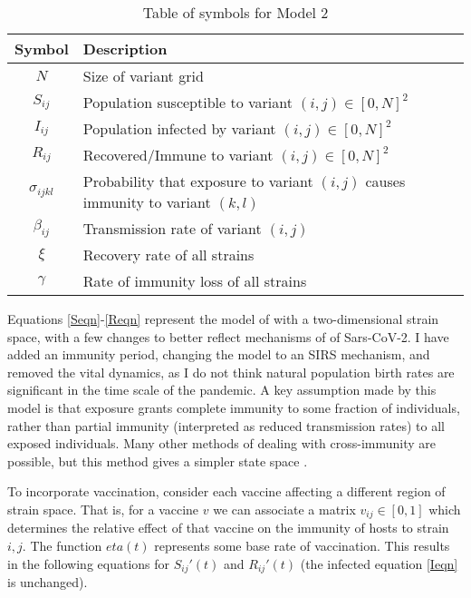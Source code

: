 \documentclass{article}
\begin{document}
\begin{table}[h!]
    \begin{center}
        \begin{tabular}{c|p{8cm}}
            Symbol & Description \\
            \hline
            \hline
            $N$ & Size of variant grid \\
            $S_{ij}$ & Population susceptible to variant $(i,j) \in [0,N]^2$ \\
            $I_{ij}$ & Population infected by variant $(i,j) \in [0,N]^2$\\
            $R_{ij}$ & Recovered/Immune to variant $(i,j) \in [0,N]^2$\\
            $\sigma_{ijkl}$ & Probability that exposure to variant $(i,j)$ causes immunity \newline to variant $(k,l)$\\
            $\beta_{ij}$ & Transmission rate of variant $(i,j)$\\
            $\xi$ & Recovery rate of all strains \\
            $\gamma$ & Rate of immunity loss of all strains \\
    \end{tabular}
    \caption{Table of symbols for Model 2}

    \label{variables_2}
    \end{center}
\end{table}

    

Equations \ref{Seqn}-\ref{Reqn} represent the model of \cite{gogDynamicsSelectionManystrain2002} with a two-dimensional strain space, with a few changes to better reflect mechanisms of of Sars-CoV-2. I have added an immunity period, changing the model to an SIRS mechanism, and removed the vital dynamics, as I do not think natural population birth rates are significant in the time scale of the pandemic. A key assumption made by this model is that exposure grants complete immunity to some fraction of individuals, rather than partial immunity (interpreted as reduced transmission rates) to all exposed individuals. Many other methods of dealing with cross-immunity are possible, but this method gives a simpler state space \cite{Castillo_Chavez_Blower_Driessche_Kirschner_Yakubu_2002}.


To incorporate vaccination, consider each vaccine affecting a different region of strain space. That is, for a vaccine $v$ we can associate a matrix $v_{ij} \in [0,1]$ which determines the relative effect of that vaccine on the immunity of hosts to strain $i,j$. The function $eta(t)$ represents some base rate of vaccination. This results in the following equations for $S_{ij}'(t)$ and $ R_{ij}'(t) $ (the infected equation \ref{Ieqn} is unchanged).
\end{document}
